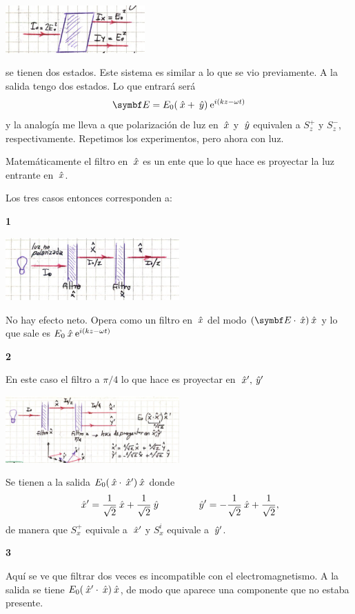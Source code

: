 \documentclass[10pt,oneside]{CBFT_book}
\begin{document}
\includegraphics[width=0.4\textwidth]{images/fig_ft2_birref.jpg}

se tienen dos estados. Este sistema es similar a lo que se vio previamente. A la salida tengo
dos estados.
Lo que entrará será 
\[
	\vb E = E_0 ( \xver + \yver ) \euler^{i( kz - \omega t)}
\]
y la analogía me lleva a que polarización de luz en $\:\hat{x}$ y $\:\hat{y}$ equivalen a $S_z^+$ y $S_z^-$,
respectivamente.
Repetimos los experimentos, pero ahora con luz.

Matemáticamente el filtro en $\:\hat{x}$ es un ente que lo que hace es proyectar la luz entrante
en $\:\hat{x}$.

Los tres casos entonces corresponden a:

{\bf 1}

\includegraphics[width=0.5\textwidth]{images/fig_ft2_polarizacion_1.jpg}

No hay efecto neto. Opera como un filtro en $\:\hat{x}$ del modo $(\vb E\cdot\xver)\xver$
y lo que sale es $E_0 \:\hat{x} \:\mathrm{e}^{i( kz - \omega t)}$

{\bf 2}

En este caso el filtro a $\pi/4$ lo que hace es proyectar en $\:\hat{x}', \:\hat{y}'$

\includegraphics[width=0.5\textwidth]{images/fig_ft2_polarizacion_2.jpg}

Se tienen a la salida $E_0(\:\hat{x}\cdot\:\hat{x}')\:\hat{x}$ donde
\[
	\:\hat{x}' = \frac{1}{\sqrt{2}} \:\hat{x} +  \frac{1}{\sqrt{2}} \:\hat{y} \qquad \qquad 
	\:\hat{y}' = -\frac{1}{\sqrt{2}} \:\hat{x} +  \frac{1}{\sqrt{2}}, 
\]
de manera que $S_x^+$ equivale a $\:\hat{x}'$ y $S_x^i$ equivale a $\:\hat{y}'$.

{\bf 3}

Aquí se ve que filtrar dos veces es incompatible con el electromagnetismo.
A la salida se tiene $E_0(\:\hat{x}'\cdot\:\hat{x})\:\hat{x}$, de modo que aparece una componente
que no estaba presente.
\end{document}
